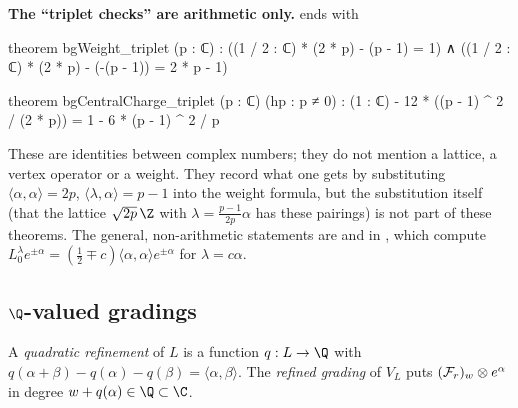 \begin{warning}
\textbf{The ``triplet checks'' are arithmetic only.}  ends with
\begin{leancode}
theorem bgWeight_triplet (p : ℂ) :
    ((1 / 2 : ℂ) * (2 * p) - (p - 1) = 1) ∧
      ((1 / 2 : ℂ) * (2 * p) - (-(p - 1)) = 2 * p - 1)

theorem bgCentralCharge_triplet (p : ℂ) (hp : p ≠ 0) :
    (1 : ℂ) - 12 * ((p - 1) ^ 2 / (2 * p)) = 1 - 6 * (p - 1) ^ 2 / p
\end{leancode}
These are identities between complex numbers; they do not mention a lattice, a vertex operator or a weight. They
record what one gets by substituting $\langle\alpha,\alpha\rangle=2p$, $\langle\lambda,\alpha\rangle=p-1$ into the weight
formula, but the substitution itself (that the lattice $\sqrt{2p}\,\Z$ with $\lambda=\frac{p-1}{2p}\alpha$ has these pairings)
is not part of these theorems. The general, non-arithmetic statements are  and
 in , which compute
$L^\lambda_0e^{\pm\alpha}=(\frac12\mp c)\langle\alpha,\alpha\rangle e^{\pm\alpha}$ for $\lambda=c\alpha$.
\end{warning}

\subsection{\texorpdfstring{$\Q$}{Q}-valued gradings}

\begin{definition}\label{l05:def:quadrefine}
A \emph{quadratic refinement} of $L$ is a function $q:L\to\Q$ with $q(\alpha+\beta)-q(\alpha)-q(\beta)=\langle\alpha,\beta\rangle$.
The \emph{refined grading} of $V_L$ puts $(\mathcal{F}_r)_w\otimes e^\alpha$ in degree $w+q(\alpha)\in\Q\subset\C$.
\end{definition}

